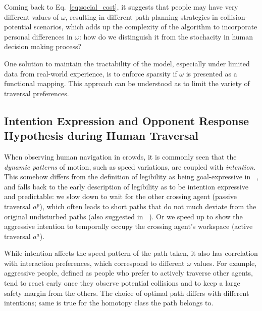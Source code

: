 \documentclass[conference]{IEEEtran}
\begin{document}
Coming back to Eq.~\ref{eq:social_cost}, it suggests that people may have 
very different values of $\omega$, resulting in different path planning 
strategies in collision-potential scenarios, which adds up the complexity of the 
algorithm to incorporate personal differences in $\omega$: how do we 
distinguish it from the stochacity in human decision making process? 


One solution to maintain the tractability of the model, especially under 
limited data from real-world experience, is to enforce sparsity if $\omega$ is 
presented as a functional mapping. This approach can be understood as to limit 
the variety of traversal preferences.
\vspace{-.3em}
\subsection{Intention Expression and Opponent Response Hypothesis during Human Traversal}
When observing human navigation in crowds, it is commonly seen that the 
\textit{dynamic patterns} of motion, such as speed variations, are coupled 
with \textit{intention}. This somehow differs from the 
definition of legibility as being goal-expressive in 
~\cite{dragan2013legibility}, and falls back to the early description of 
legibility as to be intention 
expressive and predictable: we slow down to wait for the other crossing agent 
(passive traversal $a^p$), which often leads to short paths that do not much 
deviate from the original undisturbed paths (also suggested in 
~\cite{kruse2012legible}). Or we speed up to show the 
aggressive intention to temporally occupy the crossing agent's workspace (active 
traversal $a^a$). 

While intention affects the speed pattern of the path taken, it also has 
correlation with interaction preferences, which correspond to different $\omega$ 
values. For example, aggressive people, defined as people who prefer to actively traverse 
other agents, tend to react early once they observe potential collisions and 
to keep a large safety margin from the others. The choice of optimal path 
differs with different intentions; same is true for the homotopy class the 
path belongs to.
\end{document}
